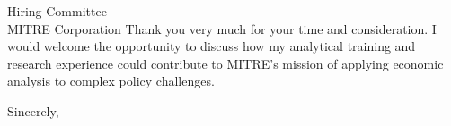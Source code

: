 \documentclass[11pt,letterpaper]{letter}
\begin{document}
\begin{letter}{
Hiring Committee \\
MITRE Corporation
}
Thank you very much for your time and consideration. I would welcome the opportunity to discuss how my analytical training and research experience could contribute to MITRE’s mission of applying economic analysis to complex policy challenges.

\closing{Sincerely,}

\end{letter}
\end{document}

